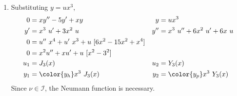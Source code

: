 \begin{enumerate}
    \item Substituting $y = ux^3 $,
          \begin{align}
              0   & = xy'' - 5y' + xy                             &
              y   & = ux^3                                          \\
              y'  & = x^3\ u'+ 3x^2\ u                            &
              y'' & = x^3\ u'' + 6x^2\ u' + 6x\ u                   \\
              0   & = u''\ x^4 + u'\ x^3 + u\ [6x^2 -15x^2 + x^4]   \\
              0   & = x^2 u'' + xu' + u\ [x^2 - 3^2]                \\
              u_1 & = J_3(x)                                      &
              u_2 & = Y_3(x)                                        \\
              y_1 & = \color{y_h} x^{3 }\ J_3(x)                  &
              y_2 & = \color{y_p} x^{3 }\ Y_3(x)
          \end{align}
          Since $ \nu \in \mathcal{I} $, the Neumann function is necessary.


\end{enumerate}
